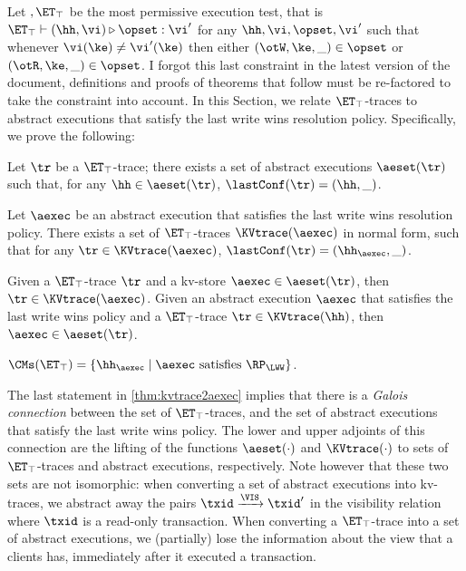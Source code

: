 Let $,\ET_\top$ be the most permissive execution test, that is 
$\ET_\top \vdash (\hh, \vi) \triangleright \opset: \vi'$ for any $\hh, \vi, \opset, \vi'$ 
such that whenever $\vi(\ke) \neq \vi'(\ke)$ then either $(\otW, \ke, \_) \in \opset$ 
or $(\otR, \ke, \_) \in \opset$.
{\color{red} I forgot this last constraint in the latest version of the document, definitions 
and proofs of theorems that follow must be re-factored to take the constraint into account.}
In this Section, we relate $\ET_{\top}$-traces to abstract executions that satisfy the last write wins 
resolution policy. Specifically, we prove the following: 
\begin{theorem}
\label{thm:kvtrace2aexec}
Let $\tr$ be a $\ET_{\top}$-trace; there exists a set of abstract executions $\aeset({\tr})$ 
such that, for any $\hh \in \aeset(\tr)$, $\lastConf(\tr) = (\hh, \_)$.

Let $\aexec$ be an abstract execution that satisfies the last write wins resolution policy. 
There exists a set of $\ET_{\top}$-traces $\KVtrace({\aexec})$ in normal form, 
such that for any $\tr \in \KVtrace({\aexec})$, $\lastConf(\tr) = (\hh_{\aexec}, \_)$. 

{\color{red} Given a $\ET_{\top}$-trace $\tr$ and a kv-store $\aexec \in \aeset(\tr)$, then 
$\tr \in \KVtrace(\aexec)$. Given an abstract execution $\aexec$ that satisfies 
the last write wins policy and a $\ET_{\top}$-trace $\tr \in \KVtrace(\hh)$, 
then $\aexec \in \aeset(\tr)$. }
\end{theorem}

\begin{corollary} 
\label{cor:kvtrace2aexec}
$\CMs(\ET_{\top}) = \{\hh_{\aexec} \mid \aexec \text{ satisfies } \RP_{\LWW}\}$.
\end{corollary}

The last statement in \cref{thm:kvtrace2aexec} implies that there is a \emph{Galois connection}
between the set of $\ET_{\top}$-traces, and the set of abstract executions that satisfy the 
last write wins policy. The lower and upper adjoints of this connection are the 
lifting of the functions $\aeset(\cdot)$ and $\KVtrace(\cdot)$ to sets of $\ET_{\top}$-traces 
and abstract executions, respectively. Note however that these two sets are not isomorphic: 
when converting a set of abstract executions into kv-traces, we abstract away the 
pairs $\txid \xrightarrow{\VIS} \txid'$ in the visibility relation where $\txid$ is a read-only 
transaction. When converting a $\ET_{\top}$-trace into a set of abstract executions, 
we (partially) lose the information about the view that a clients has, immediately after it executed a transaction.

